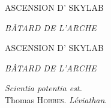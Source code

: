 \documentclass[a4paper,12pt,twoside,french]{book}
\begin{document}
  \frontmatter


  \thispagestyle{empty}
  \null\vfill           %

  \begin{center}
    {
      {
        \large
        \MakeUppercase{
          Ascension d’\elena{} skylab}
          \vspace{0.5em}
          
          \MakeUppercase{{\em{}bâtard de l’Arche}
        }
      }

    }
  \end{center}

  \vfill\null           %

  


  \cleardoublepage

  \thispagestyle{empty}
  \null\vfill           %

  \begin{center}
    {

      {
        \Huge
        \MakeUppercase{
          Ascension d’\elena{} skylab}
          \vspace{0.5em}
          
          \MakeUppercase{{\em{}bâtard de l’Arche}
        }
      }

      {
        \vspace{2em}
        \large
        \begin{flushright}
          {\em Scientia potentia est.}\\
%
          {\normalsize Thomas \textsc{Hobbes}. {\em Léviathan}.}
        \end{flushright}
      }
    }
  \end{center}
\end{document}
